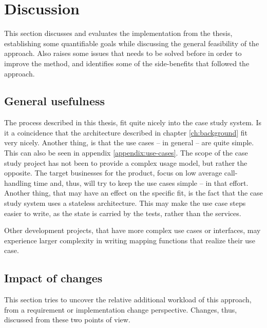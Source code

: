 \chapter{Discussion}
This section discusses and evaluates the implementation from the thesis, establishing some quantifiable goals while discussing the general feasibility of the approach. Also raises some issues that needs to be solved before in order to improve the method, and identifies some of the side-benefits that followed the approach.


\section{General usefulness}

The process described in this thesis, fit quite nicely into the case study system. Is it a coincidence that the architecture described in chapter \ref{ch:background} fit very nicely. Another thing, is that the use cases -- in general -- are quite simple. This can also be seen in appendix \ref{appendix:use-cases}. The scope of the case study project has not been to provide a complex usage model, but rather the opposite. The target businesses for the product, focus on low average call-handling time and, thus, will try to keep the use cases simple -- in that effort. Another thing, that may have an effect on the specific fit, is the fact that the case study system uses a stateless architecture. This may make the use case steps easier to write, as the state is carried by the tests, rather than the services.\medskip

\noindent Other development projects, that have more complex use cases or interfaces, may experience larger complexity in writing mapping functions that realize their use case.

\section{Impact of changes}
This section tries to uncover the relative additional workload of this approach, from a requirement or implementation change perspective. Changes, thus, discussed from these two points of view.

